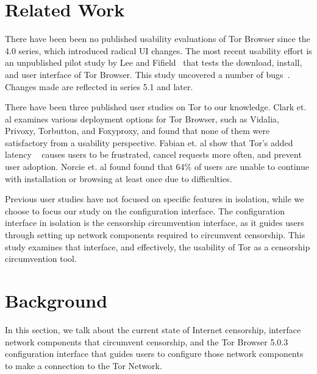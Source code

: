 \documentclass[USenglish,oneside,twocolumn]{article}
\begin{document}
\section{Related Work} 
There have been been no published usability evaluations of
Tor Browser since the 4.0 series, which introduced radical UI changes. 
The most recent usability effort is an unpublished pilot study  by Lee and Fifield~\cite {uxsprint} 
that tests the download, install, and  user interface of Tor Browser.  This study uncovered a number of bugs~\cite{uxsprint2015-tickets}. Changes made are reflected in series 5.1 and later. 

There have been three published user studies on Tor to our knowledge. Clark et. al examines various deployment
options for Tor Browser, such as Vidalia, Privoxy, Torbutton, and Foxyproxy, and found that none of them 
were satisfactory from a usability perspective. Fabian et. al show that Tor's added latency 
~\cite{dingledine2009performance} causes users
to be frustrated, cancel requests more often, and prevent user adoption. Norcie et. al found found that 
64\% of users are unable to continue with installation or browsing at least once due to difficulties. 

Previous user studies have not focused on specific features in isolation, while we choose to focus our study on 
the configuration interface. The configuration interface in isolation is the censorship circumvention 
interface, as it guides users through setting up network components required to circumvent censorship. 
This study examines that interface, and effectively, the usability of Tor as a censorship circumvention tool. 

\section{Background} 
In this section, we talk about the current state of Internet censorship, interface network components that circumvent censorship, and the Tor Browser 5.0.3 configuration interface that guides users to configure those network components to make a connection to the Tor Network. 
\end{document}
